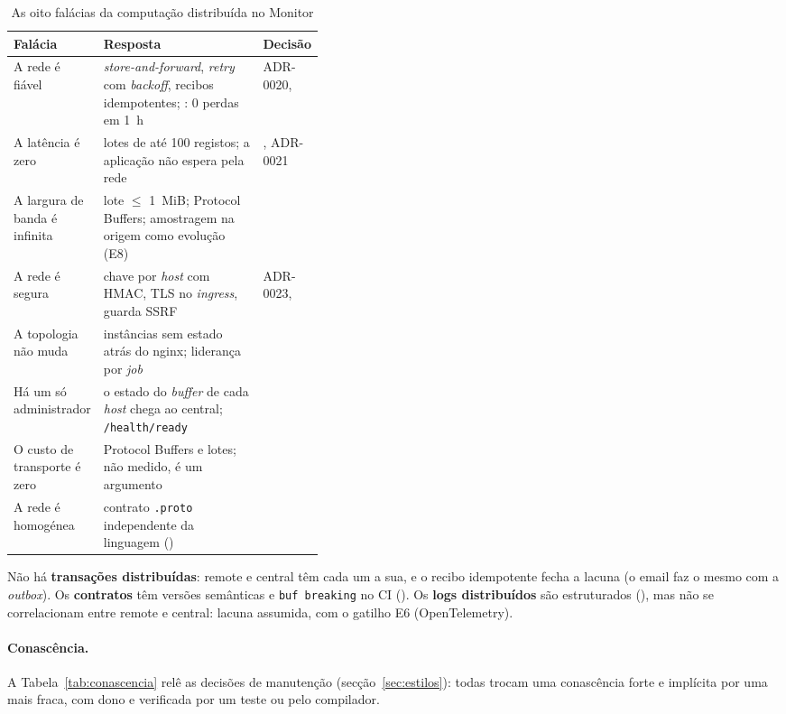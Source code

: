 \begin{table}[htbp]
  \centering\small
  \caption{As oito falácias da computação distribuída no Monitor}
  \label{tab:falacias}
  \begin{tabularx}{\linewidth}{L{0.27\linewidth}YL{0.13\linewidth}}
    \toprule
    Falácia & Resposta & Decisão \\
    \midrule
    A rede é fiável & \emph{store-and-forward}, \emph{retry} com \emph{backoff}, recibos idempotentes; : 0 perdas em 1~h & ADR-0020,  \\
    A latência é zero & lotes de até 100 registos; a aplicação não espera pela rede & , ADR-0021 \\
    A largura de banda é infinita & lote $\le$ 1~MiB; Protocol Buffers; amostragem na origem como evolução (E8) &  \\
    A rede é segura & chave por \emph{host} com HMAC, TLS no \emph{ingress}, guarda SSRF & ADR-0023,  \\
    A topologia não muda & instâncias sem estado atrás do nginx; liderança por \emph{job} &  \\
    Há um só administrador & o estado do \emph{buffer} de cada \emph{host} chega ao central; \texttt{/health/ready} &  \\
    O custo de transporte é zero & Protocol Buffers e lotes; não medido, é um argumento &  \\
    A rede é homogénea & contrato \texttt{.proto} independente da linguagem () &  \\
    \bottomrule
  \end{tabularx}
\end{table}

Não há \textbf{transações distribuídas}: remote e central têm cada um a sua, e o recibo idempotente fecha a lacuna
(o email faz o mesmo com a \emph{outbox}). Os \textbf{contratos} têm versões semânticas e \texttt{buf breaking} no
CI (). Os \textbf{logs distribuídos} são estruturados (), mas não se correlacionam entre remote e
central: lacuna assumida, com o gatilho E6 (OpenTelemetry).

\paragraph{Conascência.}
A Tabela~\ref{tab:conascencia} relê as decisões de manutenção (secção~\ref{sec:estilos}): todas trocam uma
conascência forte e implícita por uma mais fraca, com dono e verificada por um teste ou pelo compilador.

